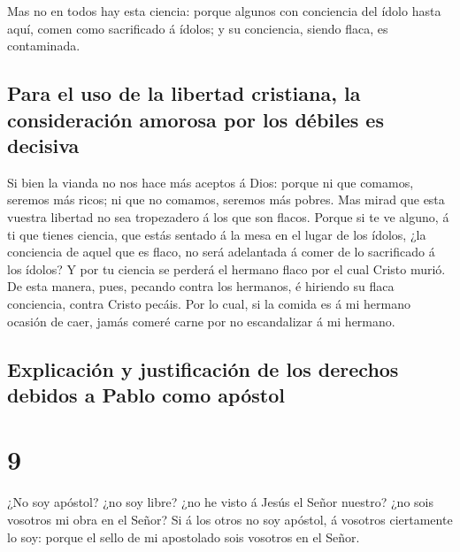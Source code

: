  Mas no en todos hay esta ciencia: porque algunos con
conciencia del ídolo hasta aquí, comen como sacrificado á ídolos; y su
conciencia, siendo flaca, es contaminada.

\hypertarget{para-el-uso-de-la-libertad-cristiana-la-consideraciuxf3n-amorosa-por-los-duxe9biles-es-decisiva}{%
\subsection{Para el uso de la libertad cristiana, la consideración
amorosa por los débiles es
decisiva}\label{para-el-uso-de-la-libertad-cristiana-la-consideraciuxf3n-amorosa-por-los-duxe9biles-es-decisiva}}

 Si bien la vianda no nos hace más aceptos á Dios: porque
ni que comamos, seremos más ricos; ni que no comamos, seremos más
pobres.  Mas mirad que esta vuestra libertad no sea
tropezadero á los que son flacos.  Porque si te ve
alguno, á ti que tienes ciencia, que estás sentado á la mesa en el lugar
de los ídolos, ¿la conciencia de aquel que es flaco, no será adelantada
á comer de lo sacrificado á los ídolos?  Y por tu ciencia
se perderá el hermano flaco por el cual Cristo murió.  De
esta manera, pues, pecando contra los hermanos, é hiriendo su flaca
conciencia, contra Cristo pecáis.  Por lo cual, si la
comida es á mi hermano ocasión de caer, jamás comeré carne por no
escandalizar á mi hermano.

\hypertarget{explicaciuxf3n-y-justificaciuxf3n-de-los-derechos-debidos-a-pablo-como-apuxf3stol}{%
\subsection{Explicación y justificación de los derechos debidos a Pablo
como
apóstol}\label{explicaciuxf3n-y-justificaciuxf3n-de-los-derechos-debidos-a-pablo-como-apuxf3stol}}

\hypertarget{section-8}{%
\section{9}\label{section-8}}

 ¿No soy apóstol? ¿no soy libre? ¿no he visto á Jesús el
Señor nuestro? ¿no sois vosotros mi obra en el Señor?  Si
á los otros no soy apóstol, á vosotros ciertamente lo soy: porque el
sello de mi apostolado sois vosotros en el Señor.

